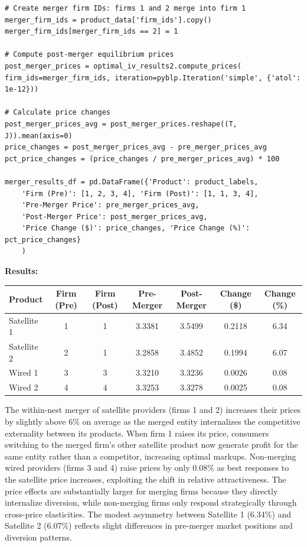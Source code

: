 \documentclass[english,11pt]{article}
\begin{document}
\begin{enumerate}
\begin{verbatim}
# Create merger firm IDs: firms 1 and 2 merge into firm 1
merger_firm_ids = product_data['firm_ids'].copy()
merger_firm_ids[merger_firm_ids == 2] = 1

# Compute post-merger equilibrium prices
post_merger_prices = optimal_iv_results2.compute_prices(
firm_ids=merger_firm_ids, iteration=pyblp.Iteration('simple', {'atol': 1e-12}))

# Calculate price changes
post_merger_prices_avg = post_merger_prices.reshape((T, J)).mean(axis=0)
price_changes = post_merger_prices_avg - pre_merger_prices_avg
pct_price_changes = (price_changes / pre_merger_prices_avg) * 100

merger_results_df = pd.DataFrame({'Product': product_labels,
    'Firm (Pre)': [1, 2, 3, 4], 'Firm (Post)': [1, 1, 3, 4],
    'Pre-Merger Price': pre_merger_prices_avg,
    'Post-Merger Price': post_merger_prices_avg,
    'Price Change ($)': price_changes, 'Price Change (%)': pct_price_changes}
    )
\end{verbatim}

\textbf{Results:}

\begin{center}
\begin{tabular}{lcccccc}
\hline
Product & Firm (Pre) & Firm (Post) & Pre-Merger & Post-Merger & Change (\$) & Change (\%) \\
\hline
Satellite 1 & 1 & 1 & 3.3381 & 3.5499 & 0.2118 & 6.34 \\
Satellite 2 & 2 & 1 & 3.2858 & 3.4852 & 0.1994 & 6.07 \\
Wired 1 & 3 & 3 & 3.3210 & 3.3236 & 0.0026 & 0.08 \\
Wired 2 & 4 & 4 & 3.3253 & 3.3278 & 0.0025 & 0.08 \\
\hline
\end{tabular}
\end{center}

The within-nest merger of satellite providers (firms 1 and 2) increases their prices by slightly above 6\% on average as the merged entity internalizes the competitive externality between its products. When firm 1 raises its price, consumers switching to the merged firm's other satellite product now generate profit for the same entity rather than a competitor, increasing optimal markups. Non-merging wired providers (firms 3 and 4) raise prices by only 0.08\% as best responses to the satellite price increases, exploiting the shift in relative attractiveness. The price effects are substantially larger for merging firms because they directly internalize diversion, while non-merging firms only respond strategically through cross-price elasticities. The modest asymmetry between Satellite 1 (6.34\%) and Satellite 2 (6.07\%) reflects slight differences in pre-merger market positions and diversion patterns.


\end{enumerate}
\end{document}
